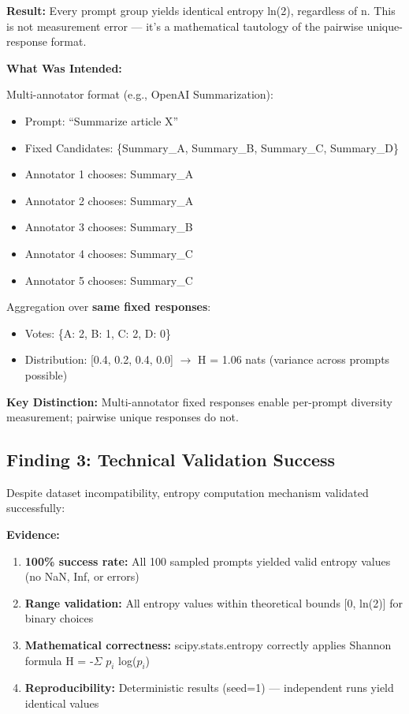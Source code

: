 \textbf{Result:} Every prompt group yields identical entropy ln(2), regardless of n. This is not measurement error — it's a mathematical tautology of the pairwise unique-response format.

\textbf{What Was Intended:}

Multi-annotator format (e.g., OpenAI Summarization):
\begin{itemize}
\item Prompt: ``Summarize article X''
\item Fixed Candidates: \{Summary\_A, Summary\_B, Summary\_C, Summary\_D\}
\item Annotator 1 chooses: Summary\_A
\item Annotator 2 chooses: Summary\_A
\item Annotator 3 chooses: Summary\_B
\item Annotator 4 chooses: Summary\_C
\item Annotator 5 chooses: Summary\_C
\end{itemize}

Aggregation over \textbf{same fixed responses}:
\begin{itemize}
\item Votes: \{A: 2, B: 1, C: 2, D: 0\}
\item Distribution: [0.4, 0.2, 0.4, 0.0] $\rightarrow$ H = 1.06 nats (variance across prompts possible)
\end{itemize}

\textbf{Key Distinction:} Multi-annotator fixed responses enable per-prompt diversity measurement; pairwise unique responses do not.

\subsection{Finding 3: Technical Validation Success}

Despite dataset incompatibility, entropy computation mechanism validated successfully:

\textbf{Evidence:}
\begin{enumerate}
\item \textbf{100\% success rate:} All 100 sampled prompts yielded valid entropy values (no NaN, Inf, or errors)
\item \textbf{Range validation:} All entropy values within theoretical bounds [0, ln(2)] for binary choices
\item \textbf{Mathematical correctness:} scipy.stats.entropy correctly applies Shannon formula H = -$\Sigma$ $p_i$ log($p_i$)
\item \textbf{Reproducibility:} Deterministic results (seed=1) — independent runs yield identical values
\end{enumerate}

